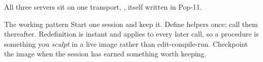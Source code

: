 All three servers sit on one transport, , itself
written in Pop-11.

\begin{callout}{The working pattern}
Start one session and keep it. Define helpers once; call them thereafter.
Redefinition is instant and applies to every later call, so a procedure is
something you \emph{sculpt} in a live image rather than edit-compile-run.
Checkpoint the image when the session has earned something worth keeping.
\end{callout}
